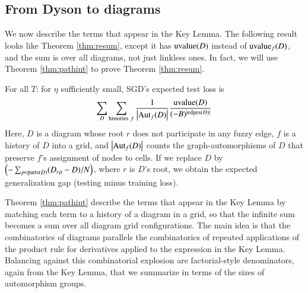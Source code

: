     \subsection{From Dyson to diagrams}                             \label{appendix:toward-diagrams}


        We now describe the terms that appear in the Key Lemma.  The following
        result looks like Theorem \ref{thm:resum}, except it has $\text{\textnormal{uvalue}}(D)$
        instead of $\text{\textnormal{uvalue}}_f(D)$, and the sum is over all diagrams, not just
        linkless ones.  In fact, we will use Theorem \ref{thm:pathint} to
        prove Theorem \ref{thm:resum}.

        \begin{thm} \label{thm:pathint}
            For all $T$: for $\eta$ sufficiently small, SGD's expected test
            loss is
            \begin{equation*}\label{eq:sgdcoef}
                \sum_{D}
                    \sum_{\text{histories}~f}
                    \frac{1}{\left|\text{\textnormal{Aut}}_f(D)\right|}
                \frac{\text{\textnormal{uvalue}}(D)}{(-B)^{|\text{\textnormal{edges}}(D)|}}
            \end{equation*}
            Here, $D$ is a diagram whose root $r$ does not participate in
            any fuzzy edge, $f$ is a history of $D$ into a grid, and
            $\left|\text{\textnormal{Aut}}_f(D)\right|$ counts the graph-automorphisms of $D$ that
            preserve $f$'s assignment of nodes to cells.
            If we replace $D$ by 
            $
                \left(-\sum_{p \in \text{\textnormal{parts}}(D)} (D_{rp} - D)/N\right)
            $, where $r$ is $D$'s root,
            we obtain the expected generalization gap (testing minus training loss).
        \end{thm}

        Theorem \ref{thm:pathint} describe the terms that appear in the Key
        Lemma by matching each term to a history of a diagram in a grid,
        so that the infinite sum becomes a sum over all diagram grid 
        configurations.  The main idea is that the combinatorics of diagrams
        parallels the combinatorics of repeated applications of the product
        rule for derivatives applied to the expression in the Key Lemma.
        Balancing against this combinatorial explosion are factorial-style
        denominators, again from the Key Lemma, that we summarize in terms of
        the sizes of automorphism groups.

